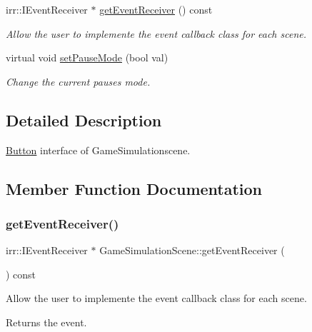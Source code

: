 \begin{DoxyCompactItemize}
irr\+::\+I\+Event\+Receiver $\ast$ \hyperlink{classGameSimulationScene_a048b2a937caff3af7b4d54f8bd404ec1}{get\+Event\+Receiver} () const
\begin{DoxyCompactList}\small\item\em Allow the user to implemente the event callback class for each scene. \end{DoxyCompactList}\item 
virtual void \hyperlink{classGameSimulationScene_a34377bab69b7a81e50f3d2c42596c574}{set\+Pause\+Mode} (bool val)
\begin{DoxyCompactList}\small\item\em Change the current pause\textquotesingle{}s mode. \end{DoxyCompactList}\end{DoxyCompactItemize}


\subsection{Detailed Description}
\hyperlink{classButton}{Button} interface of Game\+Simulationscene. 

\subsection{Member Function Documentation}
\mbox{\label{classGameSimulationScene_a048b2a937caff3af7b4d54f8bd404ec1}} 
\subsubsection{\texorpdfstring{get\+Event\+Receiver()}{getEventReceiver()}}
{\footnotesize\ttfamily irr\+::\+I\+Event\+Receiver $\ast$ Game\+Simulation\+Scene\+::get\+Event\+Receiver (\begin{DoxyParamCaption}{ }\end{DoxyParamCaption}) const\hspace{0.3cm}{\ttfamily [virtual]}}



Allow the user to implemente the event callback class for each scene. 

\begin{DoxyReturn}{Returns}
the event. 
\end{DoxyReturn}


